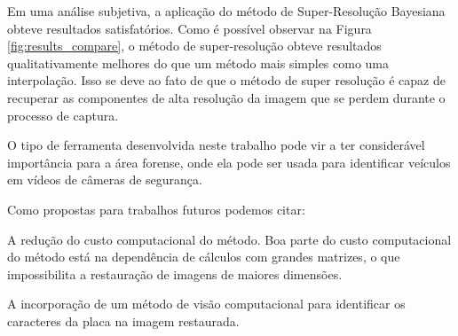Em uma análise subjetiva, a aplicação do método de Super-Resolução Bayesiana obteve resultados satisfatórios. 
Como é possível observar na Figura \ref{fig:results_compare}, o método de super-resolução obteve resultados qualitativamente melhores do que um método mais simples como uma interpolação. Isso se deve ao fato de que o método de super resolução é capaz de recuperar as componentes de alta resolução da imagem que se perdem durante o processo de captura.

O tipo de ferramenta desenvolvida neste trabalho pode vir a ter considerável importância para a área forense, onde ela pode ser usada para identificar veículos em vídeos de câmeras de segurança.

Como propostas para trabalhos futuros podemos citar:

\begin{alineas}
	\item A redução do custo computacional do método. Boa parte do custo computacional do método está na dependência de cálculos com grandes matrizes, o que impossibilita a restauração de imagens de maiores dimensões.
	\item A incorporação de um método de visão computacional para identificar os caracteres da placa na imagem restaurada.
\end{alineas}

